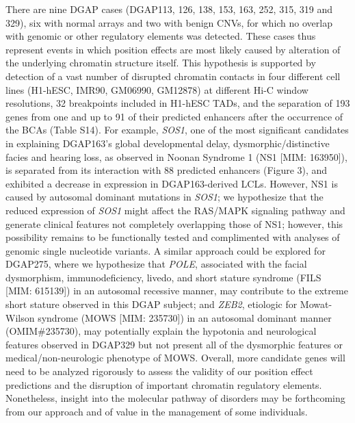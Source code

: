\documentclass[a4paper,twoside=true,openright,parskip=full,chapterprefix=true,11pt,headings=normal,bibliography=totoc,listof=totoc,titlepage=on,captions=tableabove,draft=false]{scrreprt}
\theoremstyle{definition}
\theoremstyle{definition}
\theoremstyle{definition}
\theoremstyle{remark}
\begin{document}
There are nine DGAP cases (DGAP113, 126, 138, 153, 163, 252, 315, 319
and 329), six with normal arrays and two with benign CNVs, for which no
overlap with genomic or other regulatory elements was detected. These
cases thus represent events in which position effects are most likely
caused by alteration of the underlying chromatin structure itself. This
hypothesis is supported by detection of a vast number of disrupted
chromatin contacts in four different cell lines (H1-hESC, IMR90,
GM06990, GM12878) at different Hi-C window resolutions, 32 breakpoints
included in H1-hESC TADs,\citep{Dixon2012} and the separation of 193
genes from one and up to 91 of their predicted enhancers after the
occurrence of the BCAs (Table S14). For example, \emph{SOS1}, one of the
most significant candidates in explaining DGAP163's global developmental
delay, dysmorphic/distinctive facies and hearing loss, as observed in
Noonan Syndrome 1 (NS1 {[}MIM: 163950{]}), is separated from its
interaction with 88 predicted enhancers (Figure 3), and exhibited a
decrease in expression in DGAP163-derived LCLs. However, NS1 is caused
by autosomal dominant mutations in \emph{SOS1}; we hypothesize that the
reduced expression of \emph{SOS1} might affect the RAS/MAPK signaling
pathway and generate clinical features not completely overlapping those
of NS1; however, this possibility remains to be functionally tested and
complimented with analyses of genomic single nucleotide variants. A
similar approach could be explored for DGAP275, where we hypothesize
that \emph{POLE}, associated with the facial dysmorphism,
immunodeficiency, livedo, and short stature syndrome (FILS {[}MIM:
615139{]}) in an autosomal recessive manner,\citep{PachlopnikSchmid2012}
may contribute to the extreme short stature observed in this DGAP
subject; and \emph{ZEB2}, etiologic for Mowat-Wilson syndrome (MOWS
{[}MIM: 235730{]}) in an autosomal dominant manner (OMIM\#235730), may
potentially explain the hypotonia and neurological features observed in
DGAP329 but not present all of the dysmorphic features or
medical/non-neurologic phenotype of MOWS. Overall, more candidate genes
will need to be analyzed rigorously to assess the validity of our
position effect predictions and the disruption of important chromatin
regulatory elements. Nonetheless, insight into the molecular pathway of
disorders may be forthcoming from our approach and of value in the
management of some individuals.
\end{document}
